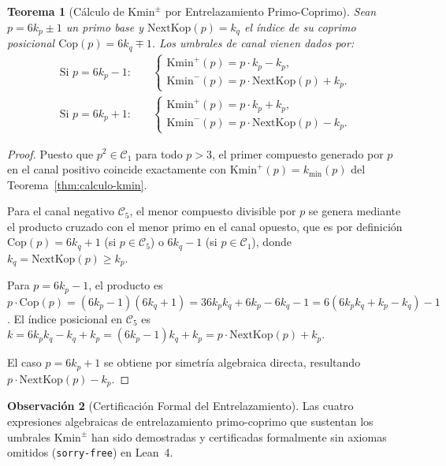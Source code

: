 \documentclass{article}
\numberwithin{equation}{section}
\theoremstyle{plain}
\newtheorem{theorem}{Teorema}[section]
\theoremstyle{definition}
\newtheorem{remark}[theorem]{Observación}
\begin{document}
\begin{theorem}[Cálculo de $\mathrm{Kmin}^\pm$ por Entrelazamiento Primo-Coprimo]
\label{thm:calculo-kmin-pm}
Sean $p = 6k_p \pm 1$ un primo base y $\mathrm{NextKop}(p) = k_q$ el índice de su coprimo posicional $\mathrm{Cop}(p) = 6k_q \mp 1$. Los umbrales de canal vienen dados por:
\begin{align}
\text{Si } p = 6k_p - 1: &\quad 
\begin{cases}
\mathrm{Kmin}^+(p) = p \cdot k_p - k_p, \\
\mathrm{Kmin}^-(p) = p \cdot \mathrm{NextKop}(p) + k_p.
\end{cases} \\
\text{Si } p = 6k_p + 1: &\quad 
\begin{cases}
\mathrm{Kmin}^+(p) = p \cdot k_p + k_p, \\
\mathrm{Kmin}^-(p) = p \cdot \mathrm{NextKop}(p) - k_p.
\end{cases}
\end{align}
\end{theorem}

\begin{proof}
Puesto que $p^2 \in \mathcal{C}_1$ para todo $p > 3$, el primer compuesto generado por $p$ en el canal positivo coincide exactamente con $\mathrm{Kmin}^+(p) = k_{\min}(p)$ del Teorema~\ref{thm:calculo-kmin}.

Para el canal negativo $\mathcal{C}_5$, el menor compuesto divisible por $p$ se genera mediante el producto cruzado con el menor primo en el canal opuesto, que es por definición $\mathrm{Cop}(p) = 6k_q + 1$ (si $p \in \mathcal{C}_5$) o $6k_q - 1$ (si $p \in \mathcal{C}_1$), donde $k_q = \mathrm{NextKop}(p) \ge k_p$.

Para $p = 6k_p - 1$, el producto es $p \cdot \mathrm{Cop}(p) = (6k_p - 1)(6k_q + 1) = 36 k_p k_q + 6k_p - 6k_q - 1 = 6(6 k_p k_q + k_p - k_q) - 1$.
El índice posicional en $\mathcal{C}_5$ es $k = 6 k_p k_q - k_q + k_p = (6k_p - 1)k_q + k_p = p \cdot \mathrm{NextKop}(p) + k_p$.

El caso $p = 6k_p + 1$ se obtiene por simetría algebraica directa, resultando $p \cdot \mathrm{NextKop}(p) - k_p$.
\end{proof}

\begin{remark}[Certificación Formal del Entrelazamiento]
\label{rem:certificacion-entrelazamiento}
Las cuatro expresiones algebraicas de entrelazamiento primo-coprimo que sustentan los umbrales $\mathrm{Kmin}^\pm$ han sido demostradas y certificadas formalmente sin axiomas omitidos (\texttt{sorry-free}) en Lean~4.
\end{remark}
\end{document}
